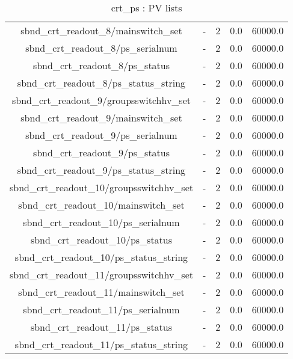 \begin{table}[ptb]
\begin{tabular}{c | c c c c}
sbnd_crt_readout_8/mainswitch_set & - & 2 & 0.0 & 60000.0\\ 
sbnd_crt_readout_8/ps_serialnum & - & 2 & 0.0 & 60000.0\\ 
sbnd_crt_readout_8/ps_status & - & 2 & 0.0 & 60000.0\\ 
sbnd_crt_readout_8/ps_status_string & - & 2 & 0.0 & 60000.0\\ 
sbnd_crt_readout_9/groupsswitchhv_set & - & 2 & 0.0 & 60000.0\\ 
sbnd_crt_readout_9/mainswitch_set & - & 2 & 0.0 & 60000.0\\ 
sbnd_crt_readout_9/ps_serialnum & - & 2 & 0.0 & 60000.0\\ 
sbnd_crt_readout_9/ps_status & - & 2 & 0.0 & 60000.0\\ 
sbnd_crt_readout_9/ps_status_string & - & 2 & 0.0 & 60000.0\\ 
sbnd_crt_readout_10/groupsswitchhv_set & - & 2 & 0.0 & 60000.0\\ 
sbnd_crt_readout_10/mainswitch_set & - & 2 & 0.0 & 60000.0\\ 
sbnd_crt_readout_10/ps_serialnum & - & 2 & 0.0 & 60000.0\\ 
sbnd_crt_readout_10/ps_status & - & 2 & 0.0 & 60000.0\\ 
sbnd_crt_readout_10/ps_status_string & - & 2 & 0.0 & 60000.0\\ 
sbnd_crt_readout_11/groupsswitchhv_set & - & 2 & 0.0 & 60000.0\\ 
sbnd_crt_readout_11/mainswitch_set & - & 2 & 0.0 & 60000.0\\ 
sbnd_crt_readout_11/ps_serialnum & - & 2 & 0.0 & 60000.0\\ 
sbnd_crt_readout_11/ps_status & - & 2 & 0.0 & 60000.0\\ 
sbnd_crt_readout_11/ps_status_string & - & 2 & 0.0 & 60000.0\\ 

\hline
\end{tabular}
\caption{crt\_ps : PV lists}
\label{tab:crt\_ps_PV_list}
\end{table}

